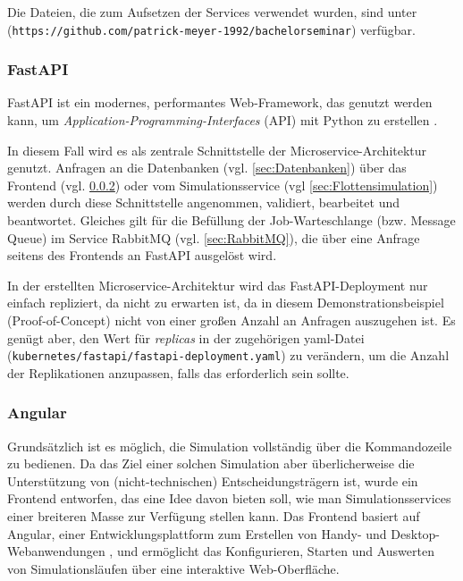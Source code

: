 \documentclass[11pt,a4paper]{article}
\begin{document}
Die Dateien, die zum Aufsetzen der Services verwendet wurden, sind unter
(\lstinline|https://github.com/patrick-meyer-1992/bachelorseminar|) \cite{Meyer_bachelorseminar}
verfügbar.

\subsubsection{FastAPI}
\label{sec:FastAPI}
FastAPI ist ein modernes, performantes Web-Framework, das genutzt werden kann, um \emph{Application-Programming-Interfaces} (API)
mit Python zu erstellen \cite{Ramirez_FastAPI}.

In diesem Fall wird es als zentrale Schnittstelle der Microservice-Architektur genutzt.
Anfragen an die Datenbanken (vgl. \ref{sec:Datenbanken})
über das Frontend (vgl. \ref{sec:Angular}) oder vom Simulationsservice (vgl \ref{sec:Flottensimulation})
werden durch diese Schnittstelle angenommen, validiert, bearbeitet und beantwortet.
Gleiches gilt für die Befüllung der Job-Warteschlange (bzw. Message Queue) im Service
RabbitMQ (vgl. \ref{sec:RabbitMQ}), die über eine Anfrage seitens des Frontends an
FastAPI ausgelöst wird.

In der erstellten Microservice-Architektur wird das FastAPI-Deployment nur einfach repliziert,
da nicht zu erwarten ist, da in diesem Demonstrationsbeispiel (Proof-of-Concept) nicht von einer
großen Anzahl an Anfragen auszugehen ist. Es genügt aber, den Wert für \emph{replicas} in der zugehörigen
yaml-Datei (\lstinline|kubernetes/fastapi/fastapi-deployment.yaml|) zu verändern, um die Anzahl der Replikationen anzupassen, 
falls das erforderlich sein sollte.

\subsubsection{Angular}
\label{sec:Angular}
Grundsätzlich ist es möglich, die Simulation vollständig über die Kommandozeile zu bedienen.
Da das Ziel einer solchen Simulation aber überlicherweise die Unterstützung von (nicht-technischen) 
Entscheidungsträgern ist, wurde ein Frontend entworfen, das eine Idee davon bieten soll, wie man Simulationsservices
einer breiteren Masse zur Verfügung stellen kann. Das Frontend basiert auf Angular,
einer Entwicklungsplattform zum Erstellen von Handy- und Desktop-Webanwendungen \cite{jain2014angularjs},
und ermöglicht das Konfigurieren, Starten und Auswerten von Simulationsläufen über eine interaktive Web-Oberfläche.

\end{document}
